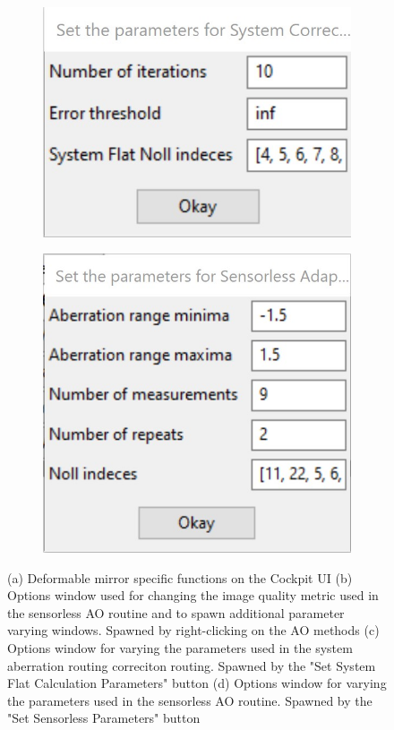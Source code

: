 \begin{figure}[H]
	\begin{subfigure}{0.45\textwidth}
		\centering
		\includegraphics[width=\linewidth]{images/direct_wavefront_sensing_options.jpg}
		\caption{}
		\label{fig:DM_direct_wavefront_sensing_options}
	\end{subfigure}
	\begin{subfigure}{0.35\textwidth}
		\centering
		\includegraphics[width=\linewidth]{images/sensorless_ao_parameters.jpg}
		\caption{}
		\label{fig:DM_sensorless_ao_parameters}
	\end{subfigure}
	\caption{(a) Deformable mirror specific functions on the Cockpit UI (b) Options window used for changing the image quality metric used in the sensorless AO routine and to spawn additional parameter varying windows. Spawned by right-clicking on the AO methods (c) Options window for varying the parameters used in the system aberration routing correciton routing. Spawned by the "Set System Flat Calculation Parameters" button (d) Options window for varying the parameters used in the sensorless AO routine. Spawned by the "Set Sensorless Parameters" button}
	\label{fig:DeepSIM_control_software}
\end{figure}


